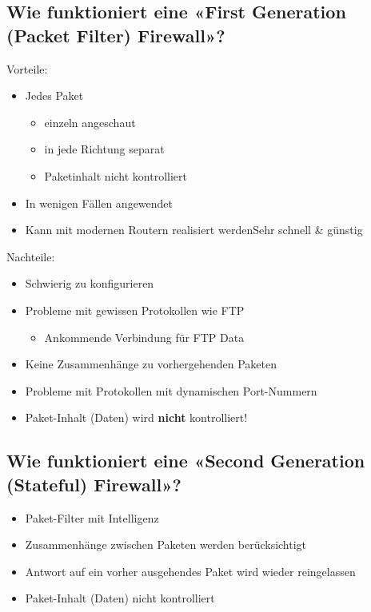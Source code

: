 \subsection*{Wie funktioniert eine «First Generation (Packet Filter) Firewall»?}
Vorteile:
\begin{itemize}
    \item Jedes Paket
    \begin{itemize}
        \item einzeln angeschaut
        \item in jede Richtung separat
        \item Paketinhalt nicht kontrolliert
    \end{itemize}
    \item In wenigen Fällen angewendet
    \item Kann mit modernen Routern realisiert werdenSehr schnell \& günstig
\end{itemize}
Nachteile:
\begin{itemize}
    \item Schwierig zu konfigurieren
    \item Probleme mit gewissen Protokollen wie FTP
    \begin{itemize}
        \item Ankommende Verbindung für FTP Data
    \end{itemize}
    \item Keine Zusammenhänge zu vorhergehenden Paketen
    \item Probleme mit Protokollen mit dynamischen Port-Nummern
    \item Paket-Inhalt (Daten) wird \textbf{nicht} kontrolliert!
\end{itemize}

\subsection*{Wie funktioniert eine «Second Generation (Stateful) Firewall»?}
\begin{itemize}
    \item Paket-Filter mit Intelligenz
    \item Zusammenhänge zwischen Paketen werden berücksichtigt
    \item Antwort auf ein vorher ausgehendes Paket wird wieder reingelassen
    \item Paket-Inhalt (Daten) nicht kontrolliert
\end{itemize}

